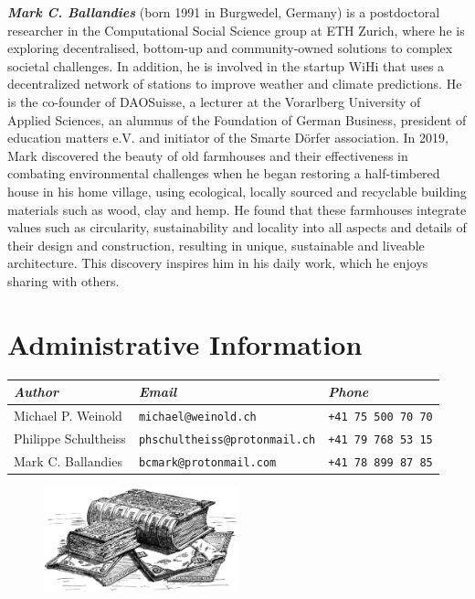\documentclass[a4paper]{article}
\begin{document}
\textbf{\textit{Mark C. Ballandies}} (born 1991 in Burgwedel, Germany) is a postdoctoral researcher in the Computational Social Science group at ETH Zurich, where he is exploring decentralised, bottom-up and community-owned solutions to complex societal challenges. In addition, he is involved in the startup WiHi that uses a decentralized network of stations to improve weather and climate predictions. He is the co-founder of DAOSuisse, a lecturer at the Vorarlberg University of Applied Sciences, an alumnus of the Foundation of German Business, president of education matters e.V. and initiator of the Smarte Dörfer association. In 2019, Mark discovered the beauty of old farmhouses and their effectiveness in combating environmental challenges when he began restoring a half-timbered house in his home village, using ecological, locally sourced and recyclable building materials such as wood, clay and hemp. He found that these farmhouses integrate values such as circularity, sustainability and locality into all aspects and details of their design and construction, resulting in unique, sustainable and liveable architecture. This discovery inspires him in his daily work, which he enjoys sharing with others.

\clearpage

\section*{\centering Administrative Information}

\begin{NiceTabularX}{\textwidth}{llX}
\textit{Author} & \textit{Email} & \textit{Phone} \\
\hline
Michael P. Weinold & \texttt{michael@weinold.ch} & \texttt{+41 75 500 70 70} \\
Philippe Schultheiss & \texttt{phschultheiss@protonmail.ch} & \texttt{+41 79 768 53 15} \\
Mark C. Ballandies & \texttt{bcmark@protonmail.com} & \texttt{+41 78 899 87 85}
\end{NiceTabularX}

\begin{figure}[h]
  \centering
  \includegraphics[width=0.5\textwidth]{./figures/books.jpg}
\end{figure}
\end{document}
